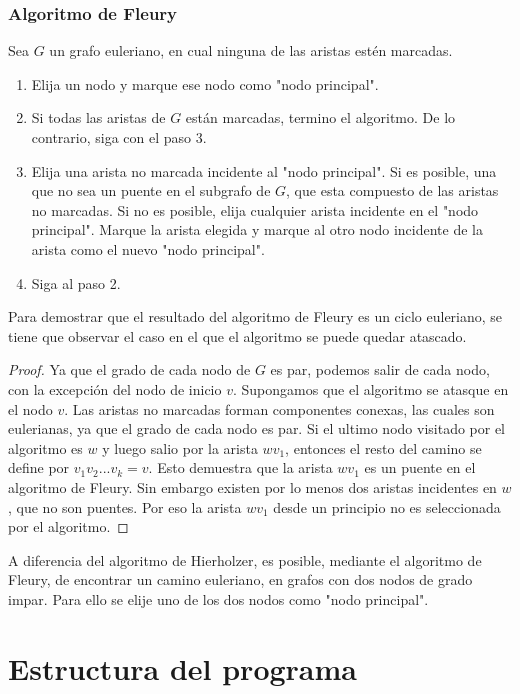 \documentclass[12pt]{article}
\begin{document}
\subsubsection{Algoritmo de Fleury}
Sea $G$ un grafo euleriano, en cual ninguna de las aristas estén marcadas.
\begin{enumerate}
\item Elija un nodo y marque ese nodo como "nodo principal".
\item Si todas las aristas de $G$ están marcadas, termino el algoritmo. De lo contrario, siga con el paso 3.
\item Elija una arista no marcada incidente al "nodo principal". Si es posible, una que no sea un puente en el subgrafo de $G$, que esta compuesto de las aristas no marcadas. Si no es posible, elija cualquier arista incidente en el "nodo principal". Marque la arista elegida y marque al otro nodo incidente de la arista como el nuevo "nodo principal".
\item Siga al paso 2.
\end{enumerate}
Para demostrar que el resultado del algoritmo de Fleury es un ciclo euleriano, se tiene que observar el caso en el que el algoritmo se puede quedar atascado.
\begin{proof}
Ya que el grado de cada nodo de $G$ es par, podemos salir de cada nodo, con la excepción del nodo de inicio $v$. Supongamos que el algoritmo se atasque en el nodo $v$. Las aristas no marcadas forman componentes conexas, las cuales son eulerianas, ya que el grado de cada nodo es par. Si el ultimo nodo visitado por el algoritmo es $w$ y luego salio por la arista $wv_{1}$, entonces el resto del camino se define por $v_{1}v_{2}...v_{k}=v$. Esto demuestra que la arista $wv_{1}$ es un puente en el algoritmo de Fleury. Sin embargo existen por lo menos dos aristas incidentes en $w$, que no son puentes. Por eso la arista $wv_{1}$ desde un principio no es seleccionada por el algoritmo.
\end{proof}
A diferencia del algoritmo de Hierholzer, es posible, mediante el algoritmo de Fleury, de encontrar un camino euleriano, en grafos con dos nodos de grado impar. Para ello se elije uno de los dos nodos como "nodo principal".
\newpage
\section{Estructura del programa}
\end{document}
